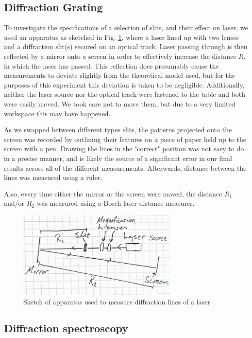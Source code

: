 \documentclass[11pt,a4paper]{article}
\begin{document}
    \subsection{Diffraction Grating\label{exp:diffgrat}}
      To investigate the specifications of a selection of slits, and their effect on laser, we used an apparatus as sketched in Fig. \ref{fig:laser}, where a laser lined up with two lenses and a diffraction slit(s) secured on an optical track. Laser passing through is then reflected by a mirror onto a screen in order to effectively increase the distance $R$, in which the laser has passed. This reflection does presumably cause the measurements to deviate slightly from the theoretical model used, but for the purposes of this experiment this deviation is taken to be negligible. 
      Additionally, neither the laser source nor the optical track were fastened to the table and both were easily moved. We took care not to move them, but due to a very limited workspace this may have happened.

      As we swapped between different types slits, the patterns projected onto the screen was recorded by outlining their features on a piece of paper held up to the screen with a pen. Drawing the lines in the "correct" position was not easy to do in a precise manner, and is likely the source of a significant error in our final results across all of the different measurements. Afterwards, distance between the lines was measured using a ruler.

      Also, every time either the mirror or the screen were moved, the distance $R_1$ and/or $R_2$ was measured using a Bosch laser distance measurer.

    \begin{figure}[H]
        \center
        \includegraphics[width=8cm]{scripts/figs/diff_diagram.png}
        \caption{Sketch of apparatus used to measure diffraction lines of a laser}
        \label{fig:laser}
    \end{figure}

    \subsection{Diffraction spectroscopy}
\end{document}
